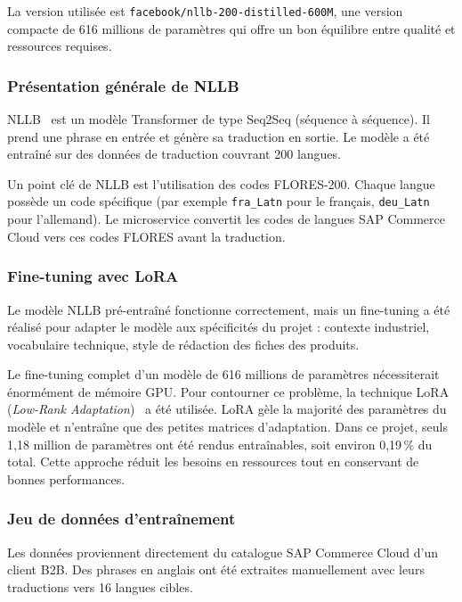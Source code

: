 La version utilisée est \texttt{facebook/nllb-200-distilled-600M}, une version compacte de 616 millions de paramètres qui offre un bon équilibre entre qualité et ressources requises.

\subsubsection{Présentation générale de NLLB}

NLLB~ est un modèle Transformer de type Seq2Seq (séquence à séquence). Il prend une phrase en entrée et génère sa traduction en sortie. Le modèle a été entraîné sur des données de traduction couvrant 200 langues.

Un point clé de NLLB est l'utilisation des codes FLORES-200. Chaque langue possède un code spécifique (par exemple \texttt{fra\_Latn} pour le français, \texttt{deu\_Latn} pour l'allemand). Le microservice convertit les codes de langues SAP Commerce Cloud vers ces codes FLORES avant la traduction.

\subsubsection{Fine-tuning avec LoRA}

Le modèle NLLB pré-entraîné fonctionne correctement, mais un fine-tuning a été réalisé pour adapter le modèle aux spécificités du projet : contexte industriel, vocabulaire technique, style de rédaction des fiches des produits.

Le fine-tuning complet d'un modèle de 616 millions de paramètres nécessiterait énormément de mémoire GPU. Pour contourner ce problème, la technique LoRA (\textit{Low-Rank Adaptation})~ a été utilisée. LoRA gèle la majorité des paramètres du modèle et n'entraîne que des petites matrices d'adaptation. Dans ce projet, seuls 1,18 million de paramètres ont été rendus entraînables, soit environ 0,19\,\% du total. Cette approche réduit les besoins en ressources tout en conservant de bonnes performances.

\subsubsection{Jeu de données d'entraînement}

Les données proviennent directement du catalogue SAP Commerce Cloud d'un client B2B. Des phrases en anglais ont été extraites manuellement avec leurs traductions vers 16 langues cibles.

